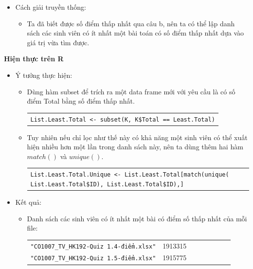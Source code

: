 \documentclass[a4paper]{article}
\theoremstyle{definition}
\begin{document}
\begin{enumerate}[a)]
\begin{itemize}
        \item Cách giải truyền thống:
        \begin{itemize}
            \item Ta đã biết được số điểm thấp nhất qua câu b, nên ta có thể lập danh sách các sinh viên có ít nhất một bài toán có số điểm thấp nhất dựa vào giá trị vừa tìm được.
        \end{itemize}
    \end{itemize}
    \bf Hiện thực trên R\normalfont
    \begin{itemize}
        \item Ý tưởng thực hiện:
        \begin{itemize}
            \item Dùng hàm subset để trích ra một data frame mới với yêu cầu là có số điểm Total bằng số điểm thấp nhất.
            \begin{center}
                \begin{tabular}{p{13cm}}
                    \texttt{List.Least.Total <- subset(K, K\$Total == Least.Total)}
                \end{tabular}
            \end{center}
            \item Tuy nhiên nếu chỉ lọc như thế này có khả năng một sinh viên có thể xuất hiện nhiều hơn một lần trong danh sách này, nên ta dùng thêm hai hàm $match()$ và $unique()$.
            \begin{center}
                \begin{tabular}{p{13cm}}
                    \texttt{List.Least.Total.Unique <- List.Least.Total[match(unique( List.Least.Total\$ID), List.Least.Total\$ID),]}
                \end{tabular}
            \end{center}
        \end{itemize}
        \item Kết quả:
        \begin{itemize}
            \item Danh sách các sinh viên có ít nhất một bài có điểm số thấp nhất của mỗi file:
            \begin{center}
                \begin{tabular}{l c c c c c c c}
                     \texttt{"CO1007\_TV\_HK192-Quiz 1.4-điểm.xlsx"} & 1913315\\
                     \texttt{"CO1007\_TV\_HK192-Quiz 1.5-điểm.xlsx"} & 1915775\\

\end{tabular}
\end{center}
\end{itemize}
\end{itemize}
\end{enumerate}
\end{document}
